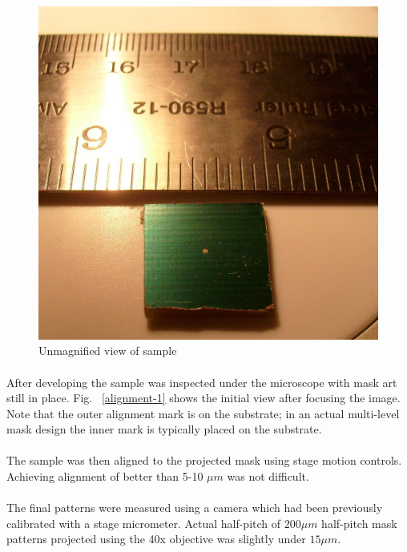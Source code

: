 \documentclass[twocolumn]{article}
\begin{document}
\begin{figure}[h!]
\begin{center}
\includegraphics[scale=0.2]{actual-size.jpg}
\end{center}
\caption{Unmagnified view of sample}
\label{actual}
\end{figure}

\paragraph*{}
After developing the sample was inspected under the microscope with mask art still in place. Fig. ~\ref{alignment-1} 
shows the initial view after focusing the image. Note that the outer alignment mark is on the substrate; in an actual
multi-level mask design the inner mark is typically placed on the substrate.

\paragraph*{}
The sample was then aligned to the projected mask using stage motion controls. Achieving alignment of better than 5-10
$\mu m$ was not difficult. 

\paragraph*{}
The final patterns were measured using a camera which had been previously calibrated with a stage micrometer. Actual
half-pitch of $200 \mu m$ half-pitch mask patterns projected using the 40x objective was slightly under $15 \mu m$.
\end{document}
